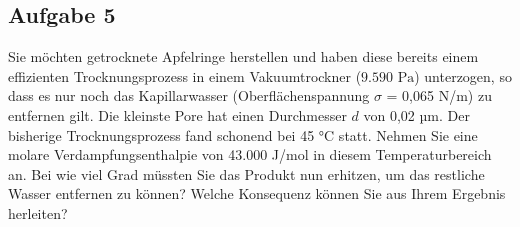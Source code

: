 \documentclass[a4paper,11pt]{article}
\newif\ifshowme
\begin{document}
\ifshowme
\antwort{
40 \% des Gesamtvolumens entsprechen dem Flüssigkeitsring:
\begin{align*}
\pi \cdot (r_a^2-r_i^2) \cdot h = 0,4 \cdot \pi \cdot r^2 \cdot h \\
 r_a^2-r_i^2 &= 0,4 r^2 \\ 
 0,6 \cdot r_a^2 &= r_i^2 \\ 
 \sqrt{0,6} \cdot r_a &= r_i
\end{align*}
Werte einsetzen: 
\begin{align*}
r_i &= \sqrt{0,6} \cdot 0,25~\text{m} \\
&= 0,193 ~\text{m}
\end{align*}
Mittlerer Durchmesser:
\begin{align*}
\left( \frac{0,25~\text{m}+0,193~\text{m}}{2} \right) \cdot 2 = 0,443~\text{m}
\end{align*}

\pp 

\textbf{Vorteile Dekanterzentrifugen} \par 
Dekanterzentrifugen arbeiten kontinuierlich und können große Feststoffmengen tolerieren. So können Teller - und Röhrenzentrifugen beispielsweise nur kleinste Mengen Feststoff vertragen. Wobei hierbei auch die Tellerzentrifuge nochmal ein bisschen mehr Feststoff toleriert als die Röhrenzentrifuge. 
}
\pagebreak
\else 
\fi 



\subsection*{Aufgabe 5}

Sie möchten getrocknete Apfelringe herstellen und haben diese bereits einem effizienten Trocknungsprozess in einem Vakuumtrockner ($9.590 \text{ Pa}$) unterzogen, so dass es nur noch das Kapillarwasser (Oberflächenspannung $\sigma$ = 0,065 N/m) zu entfernen gilt. Die kleinste Pore hat einen Durchmesser $d$ von 0,02 µm. Der bisherige Trocknungsprozess fand schonend bei 45 °C statt. Nehmen Sie eine molare Verdampfungsenthalpie von 43.000 J/mol in diesem Temperaturbereich an.
\pp
Bei wie viel Grad müssten Sie das Produkt nun erhitzen, um das restliche Wasser entfernen zu können? Welche Konsequenz können Sie aus Ihrem Ergebnis herleiten?
\end{document}
